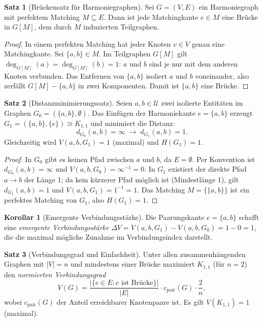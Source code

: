 ﻿\documentclass[a4paper,12pt]{article}
\theoremstyle{definition}
\newtheorem{satz}{Satz}
\newtheorem{korollar}{Korollar}
\begin{document}
\begin{satz}[Brückensatz für Harmoniegraphen]
	\label{satz:bruecke}
	Sei $G = (V, E)$ ein Harmoniegraph mit perfektem Matching $M \subseteq E$.
	Dann ist jede Matchingkante $e \in M$ eine Brücke in $G[M]$,
	dem durch $M$ induzierten Teilgraphen.
\end{satz}

\begin{proof}
	In einem perfekten Matching hat jeder Knoten $v \in V$ genau eine Matchingkante.
	Sei $\{a, b\} \in M$. Im Teilgraphen $G[M]$ gilt $\deg_{G[M]}(a) = \deg_{G[M]}(b) = 1$:
	$a$ und $b$ sind je nur mit dem anderen Knoten verbunden.
	Das Entfernen von $\{a,b\}$ isoliert $a$ und $b$ voneinander, also zerfällt
	$G[M] - \{a,b\}$ in zwei Komponenten. Damit ist $\{a,b\}$ eine Brücke. \qedhere
\end{proof}

\begin{satz}[Distanzminimierungssatz]
	\label{satz:distanz}
	Seien $a, b \in \mathcal{U}$ zwei isolierte Entitäten im Graphen
	$G_0 = (\{a,b\}, \emptyset)$.
	Das Einfügen der Harmoniekante $e = \{a,b\}$ erzeugt $G_1 = (\{a,b\}, \{e\})
	\cong K_{1,1}$ und minimiert die Distanz:
	\[
		d_{G_0}(a,b) = \infty \;\longrightarrow\; d_{G_1}(a,b) = 1.
	\]
	Gleichzeitig wird $V(a,b,G_1) = 1$ (maximal) und $H(G_1) = 1$.
\end{satz}

\begin{proof}
	In $G_0$ gibt es keinen Pfad zwischen $a$ und $b$, da $E = \emptyset$.
	Per Konvention ist $d_{G_0}(a,b) = \infty$ und $V(a,b,G_0) = \infty^{-1} = 0$.
	In $G_1$ existiert der direkte Pfad $a \to b$ der Länge 1; da kein kürzerer
	Pfad möglich ist (Mindestlänge 1), gilt $d_{G_1}(a,b) = 1$ und
	$V(a,b,G_1) = 1^{-1} = 1$.
	Das Matching $M = \{\{a,b\}\}$ ist ein perfektes Matching von $G_1$, also $H(G_1) = 1$.
	\qedhere
\end{proof}

\begin{korollar}[Emergente Verbindungsstärke]
	Die Paarungskante $e = \{a,b\}$ schafft eine \emph{emergente Verbindungsstärke}
	$\Delta V = V(a,b,G_1) - V(a,b,G_0) = 1 - 0 = 1$, die die maximal mögliche
	Zunahme im Verbindungsindex darstellt.
\end{korollar}

\begin{satz}[Verbindungsgrad und Einfachheit]
	\label{satz:verbindungsgrad}
	Unter allen zusammenhängenden Graphen mit $|V| = n$ und mindestens einer Brücke
	maximiert $K_{1,1}$ (für $n=2$) den \emph{normierten Verbindungsgrad}
	\[
		V(G) = \frac{|\{e \in E : e \text{ ist Brücke}\}|}{|E|}
		       \cdot c_{\mathrm{pair}}(G) \cdot \frac{2}{n},
	\]
	wobei $c_{\mathrm{pair}}(G)$ der Anteil erreichbarer Knotenpaare ist.
	Es gilt $V(K_{1,1}) = 1$ (maximal).
\end{satz}
\end{document}
